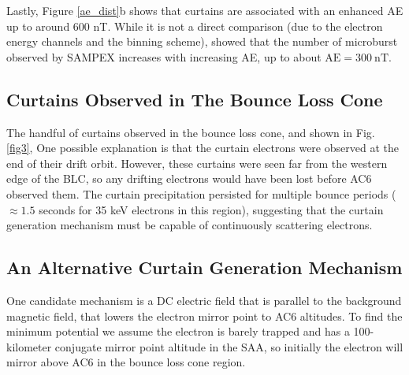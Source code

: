 \documentclass[draft]{agujournal2019}
\begin{document}
Lastly, Figure \ref{ae_dist}b shows that curtains are associated with an enhanced AE up to around 600 nT. While it is not a direct comparison (due to the electron energy channels and the binning scheme),  showed that the number of microburst observed by SAMPEX increases with increasing AE, up to about $\mathrm{AE} = 300 \ \mathrm{nT}$.
 
\subsection{Curtains Observed in The Bounce Loss Cone}
The handful of curtains observed in the bounce loss cone, and shown in Fig. \ref{fig3},  One possible explanation is that the curtain electrons were observed at the end of their drift orbit. However, these curtains were seen far from the western edge of the BLC, so any drifting electrons would have been lost before AC6 observed them. The curtain precipitation persisted for multiple bounce periods ($\approx 1.5$ seconds for 35 keV electrons in this region), suggesting that the curtain generation mechanism must be capable of continuously scattering electrons. 

\subsection{An Alternative Curtain Generation Mechanism}
 One candidate mechanism  is a DC electric field that is parallel to the background magnetic field, that lowers the electron mirror point to AC6 altitudes. To find the minimum potential we assume the electron is barely trapped and has a 100-kilometer conjugate mirror point altitude in the SAA, so initially the electron will mirror above AC6 in the bounce loss cone region. 
\end{document}
